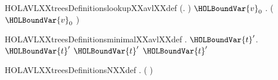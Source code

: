 \newcommand{\HOLAVLXXtreesDefinitionskeysXXdef}{\UseVerbatim{HOLAVLXXtreesDefinitionskeysXXdef}}
\begin{SaveVerbatim}{HOLAVLXXtreesDefinitionslookupXXavlXXdef}
\HOLTokenTurnstile{} (\HOLSymConst{\HOLTokenForall{}}.    \HOLSymConst{=} ) \HOLSymConst{\HOLTokenConj{}}
   \HOLSymConst{\HOLTokenForall{}} \ensuremath{\HOLBoundVar{v}\sb{\mathrm{0}}}    .
       ( \ensuremath{\HOLBoundVar{v}\sb{\mathrm{0}}}    ) \HOLSymConst{=}
       \HOLSymConst{=}    
        \HOLSymConst{\HOLTokenLt{}}     
        
\end{SaveVerbatim}
\newcommand{\HOLAVLXXtreesDefinitionslookupXXavlXXdef}{\UseVerbatim{HOLAVLXXtreesDefinitionslookupXXavlXXdef}}
\begin{SaveVerbatim}{HOLAVLXXtreesDefinitionsminimalXXavlXXdef}
\HOLTokenTurnstile{} \HOLSymConst{\HOLTokenForall{}}.   \HOLSymConst{\HOLTokenEquiv{}}
         \HOLSymConst{\HOLTokenConj{}}
       \HOLSymConst{\HOLTokenForall{}}\ensuremath{\HOLBoundVar{t}\sp{\prime{}}}.
          \ensuremath{\HOLBoundVar{t}\sp{\prime{}}} \HOLSymConst{\HOLTokenConj{}}  \ensuremath{\HOLBoundVar{t}\sp{\prime{}}} \HOLSymConst{=}   \HOLSymConst{\HOLTokenImp{}}
           \HOLSymConst{\HOLTokenLeq{}}  \ensuremath{\HOLBoundVar{t}\sp{\prime{}}}
\end{SaveVerbatim}
\newcommand{\HOLAVLXXtreesDefinitionsminimalXXavlXXdef}{\UseVerbatim{HOLAVLXXtreesDefinitionsminimalXXavlXXdef}}
\begin{SaveVerbatim}{HOLAVLXXtreesDefinitionsNXXdef}
\HOLTokenTurnstile{} \HOLSymConst{\HOLTokenForall{}}.   \HOLSymConst{=}
        (  \HOLTokenLeftbrace{} \HOLTokenBar{}   \HOLSymConst{=}  \HOLSymConst{\HOLTokenConj{}}  \HOLTokenRightbrace{})
\end{SaveVerbatim}
